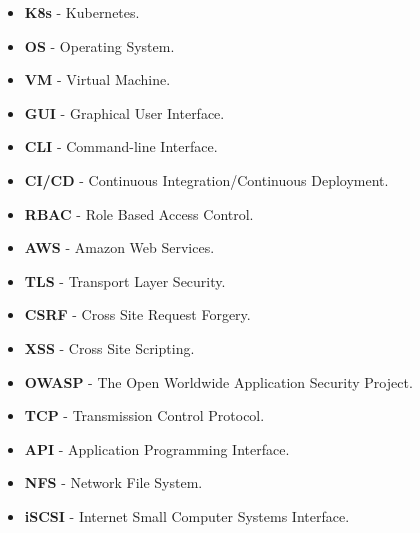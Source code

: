 \begin{itemize}
    \setlength\itemsep{1px}
    \item \textbf{K8s} - Kubernetes.
    \item \textbf{OS} - Operating System.
    \item \textbf{VM} - Virtual Machine.
    \item \textbf{GUI} - Graphical User Interface.
    \item \textbf{CLI} - Command-line Interface.
    \item \textbf{CI/CD} - Continuous Integration/Continuous Deployment.
    \item \textbf{RBAC} - Role Based Access Control.
    \item \textbf{AWS} - Amazon Web Services.
    \item \textbf{TLS} - Transport Layer Security.
    \item \textbf{CSRF} - Cross Site Request Forgery.
    \item \textbf{XSS} - Cross Site Scripting.
    \item \textbf{OWASP} - The Open Worldwide Application Security Project.
    \item \textbf{TCP} - Transmission Control Protocol.
    \item \textbf{API} - Application Programming Interface.
    \item \textbf{NFS} - Network File System.
    \item \textbf{iSCSI} - Internet Small Computer Systems Interface.
\end{itemize}



